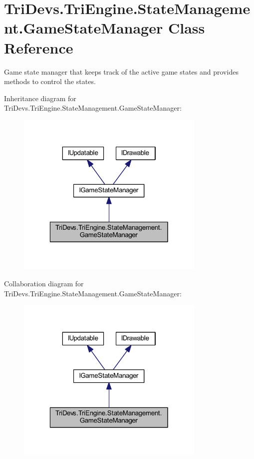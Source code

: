 \hypertarget{class_tri_devs_1_1_tri_engine_1_1_state_management_1_1_game_state_manager}{\section{Tri\-Devs.\-Tri\-Engine.\-State\-Management.\-Game\-State\-Manager Class Reference}
\label{class_tri_devs_1_1_tri_engine_1_1_state_management_1_1_game_state_manager}
}


Game state manager that keeps track of the active game states and provides methods to control the states.  




Inheritance diagram for Tri\-Devs.\-Tri\-Engine.\-State\-Management.\-Game\-State\-Manager\-:
\nopagebreak
\begin{figure}[H]
\begin{center}
\leavevmode
\includegraphics[width=256pt]{class_tri_devs_1_1_tri_engine_1_1_state_management_1_1_game_state_manager__inherit__graph}
\end{center}
\end{figure}


Collaboration diagram for Tri\-Devs.\-Tri\-Engine.\-State\-Management.\-Game\-State\-Manager\-:
\nopagebreak
\begin{figure}[H]
\begin{center}
\leavevmode
\includegraphics[width=256pt]{class_tri_devs_1_1_tri_engine_1_1_state_management_1_1_game_state_manager__coll__graph}
\end{center}
\end{figure}
